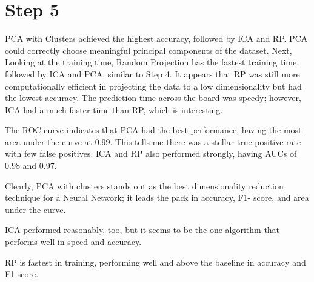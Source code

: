 \documentclass[conference]{IEEEtran}
\begin{document}
\section{Step 5}
\par PCA with Clusters achieved the highest accuracy, followed by ICA and RP. PCA could correctly choose meaningful principal components of the dataset. Next, Looking at the training time, Random Projection has the fastest training time, followed by ICA and PCA, similar to Step 4. It appears that RP was still more computationally efficient in projecting the data to a low dimensionality but had the lowest accuracy. The prediction time across the board was speedy; however, ICA had a much faster time than RP, which is interesting. 
\par The ROC curve indicates that PCA had the best performance, having the most area under the curve at 0.99. This tells me there was a stellar true positive rate with few false positives. ICA and RP also performed strongly, having AUCs of 0.98 and 0.97. 
\par Clearly, PCA with clusters stands out as the best dimensionality reduction technique for a Neural Network; it leads the pack in accuracy, F1- score, and area under the curve.
\par ICA performed reasonably, too, but it seems to be the one algorithm that performs well in speed and accuracy.
\par RP is fastest in training, performing well and above the baseline in accuracy and F1-score.
\begin{table}[htp]
    \centering
        \caption{Performance comparison of PCA, ICA, and RP with clusters.}
    \label{tab:performance_comparison}
      \resizebox{\columnwidth}{!}{%
    \begin{tabular}{lcccc}
        \toprule
         \textbf{Method} & \textbf{Accuracy} & \textbf{Training Time (s)} & \textbf{Prediction Time (s)} & \textbf{F1-Score Avg} \\
        \midrule
        \textbf{PCA w/ Clusters} & 0.9454 & 3.6799 & 0.00038 & 0.95\\
        \textbf{ICA w/ Clusters} & 0.9369 & 3.55548 & 0.00029 & 0.94\\
        \textbf{RP w/ Clusters} & 0.9300 & 2.15453 & 0.00033 & 0.93\\
        \bottomrule
        
    \end{tabular}%
    }

\end{table}
\end{document}
